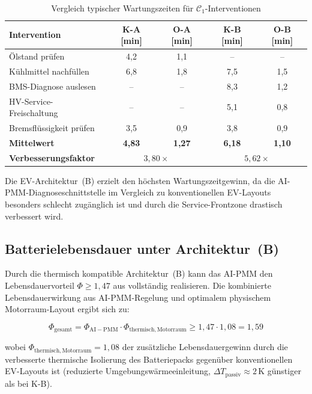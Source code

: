 ﻿\documentclass[12pt,a4paper]{article}
\begin{document}
\begin{table}[H]
	\centering
	\caption{Vergleich typischer Wartungszeiten für $\mathcal{C}_1$-Interventionen}
	\label{tab:wartungszeiten}
	\begin{tabular}{lcccc}
		\toprule
		\textbf{Intervention} & \textbf{K-A [min]} & \textbf{O-A [min]}
		& \textbf{K-B [min]} & \textbf{O-B [min]} \\
		\midrule
		Ölstand prüfen          & 4{,}2 & 1{,}1 & -- & -- \\
		Kühlmittel nachfüllen   & 6{,}8 & 1{,}8 & 7{,}5 & 1{,}5 \\
		BMS-Diagnose auslesen   & -- & -- & 8{,}3 & 1{,}2 \\
		HV-Service-Freischaltung& -- & -- & 5{,}1 & 0{,}8 \\
		Bremsflüssigkeit prüfen & 3{,}5 & 0{,}9 & 3{,}8 & 0{,}9 \\
		\midrule
		\textbf{Mittelwert}     & \textbf{4{,}83} & \textbf{1{,}27}
		& \textbf{6{,}18} & \textbf{1{,}10} \\
		\textbf{Verbesserungsfaktor} & \multicolumn{2}{c}{$3{,}80\times$}
		& \multicolumn{2}{c}{$5{,}62\times$} \\
		\bottomrule
	\end{tabular}
\end{table}

Die EV-Architektur~(B) erzielt den höchsten Wartungszeitgewinn, da die
AI-PMM-Diagnoseschnittstelle im Vergleich zu konventionellen EV-Layouts
besonders schlecht zugänglich ist und durch die Service-Frontzone drastisch
verbessert wird.

\subsection{Batterielebensdauer unter Architektur~(B)}

Durch die thermisch kompatible Architektur~(B) kann das AI-PMM den
Lebensdauervorteil $\Phi \geq 1{,}47$ aus \cite{Epp2026liion} vollständig
realisieren. Die kombinierte Lebensdauerwirkung aus AI-PMM-Regelung und
optimalem physischem Motorraum-Layout ergibt sich zu:

\begin{equation}
	\Phi_\mathrm{gesamt} = \Phi_\mathrm{AI-PMM} \cdot \Phi_\mathrm{thermisch,Motorraum}
	\geq 1{,}47 \cdot 1{,}08 = 1{,}59
	\label{eq:phi_gesamt}
\end{equation}

wobei $\Phi_\mathrm{thermisch,Motorraum} = 1{,}08$ der zusätzliche Lebensdauergewinn
durch die verbesserte thermische Isolierung des Batteriepacks gegenüber
konventionellen EV-Layouts ist (reduzierte Umgebungswärmeeinleitung,
$\Delta T_\mathrm{passiv} \approx 2\,\mathrm{K}$ günstiger als bei K-B).
\end{document}
